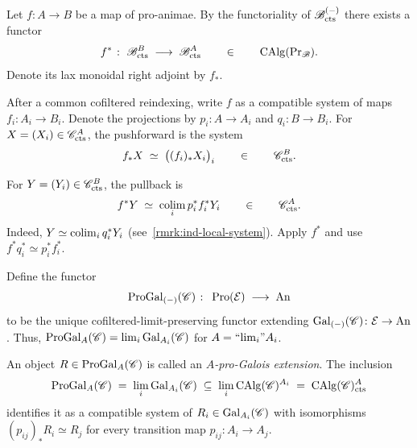 \documentclass[english,svgnames,table]{article}
\begin{document}
    \begin{definition}
        Let $f \colon A \to B$ be a map of pro-animae. By the functoriality of $\mathscr{B}_{\mathrm{cts}}^{(-)}$ there exists a functor
        \begin{equation*}
            f^* \;\colon\; \mathscr{B}_{\mathrm{cts}}^B \;\longrightarrow\; \mathscr{B}_{\mathrm{cts}}^A \qquad \in \qquad \operatorname{CAlg}(\operatorname{Pr}_{\mathscr{B}}).
        \end{equation*}
        Denote its lax monoidal right adjoint by $f_*$.
    \end{definition}
    \begin{remark}
        After a common cofiltered reindexing, write $f$ as a compatible system of maps $f_i\colon A_i\to B_i$. Denote the projections by $p_i\colon A\to A_i$ and $q_i\colon B\to B_i$. For $X=(X_i)\in\mathscr{C}_{\mathrm{cts}}^A$, the pushforward is the system
        \begin{equation*}
            f_*X \;\simeq\; \big((f_i)_*X_i\big)_i \qquad \in \qquad \mathscr{C}_{\mathrm{cts}}^B.
        \end{equation*}

        For $Y=(Y_i)\in\mathscr{C}_{\mathrm{cts}}^B$, the pullback is
        \begin{equation*}
            f^*Y \;\simeq\; \operatorname*{colim}_i p_i^*f_i^*Y_i \qquad \in \qquad \mathscr{C}_{\mathrm{cts}}^A.
        \end{equation*}
        Indeed, $Y\simeq\operatorname*{colim}_i q_i^*Y_i$ (see~\cref{rmrk:ind-local-system}). Apply $f^*$ and use $f^*q_i^*\simeq p_i^*f_i^*$.
    \end{remark}


    \begin{definition}
        Define the functor
        \begin{equation*}
            \mathrm{ProGal}_{(-)}(\mathscr{C}) \;\colon\; \operatorname{Pro}(\mathcal{E}) \;\longrightarrow\; \mathrm{An}
        \end{equation*} 
        to be the unique cofiltered-limit-preserving functor extending $\mathrm{Gal}_{(-)}(\mathscr{C}) \colon \mathcal{E} \to \mathrm{An}$. Thus, $\mathrm{ProGal}_A(\mathscr{C}) = \lim_i \mathrm{Gal}_{A_i}(\mathscr{C})$ for $A = \text{``$\lim_{i}$''} A_i$.
    
        An object $R \in \mathrm{ProGal}_A(\mathscr{C})$ is called an \emph{$A$-pro-Galois extension}. The inclusion 
        \begin{equation*}
            \mathrm{ProGal}_A(\mathscr{C}) \;=\; \lim_i\mathrm{Gal}_{A_i}(\mathscr{C}) \;\subseteq\; \lim_i \operatorname{CAlg}(\mathscr{C})^{A_i} \;=\; \operatorname{CAlg}(\mathscr{C})^A_{\mathrm{cts}}
        \end{equation*}
        identifies it as a compatible system of $R_i \in \mathrm{Gal}_{A_i}(\mathscr{C})$ with isomorphisms $(p_{ij})_* R_i \simeq R_j$ for every transition map $p_{ij} \colon A_i \to A_j$.
    \end{definition}
\end{document}
